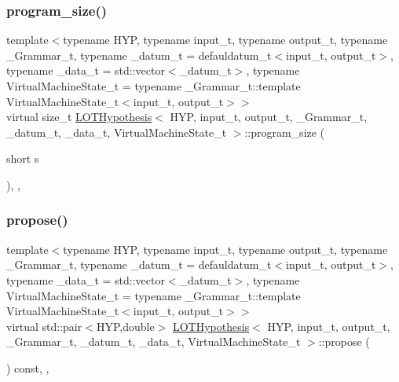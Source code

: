 \mbox{\label{class_l_o_t_hypothesis_a9fb7caa245a82c53bcfbac846ab1b327}} 
\subsubsection{\texorpdfstring{program\+\_\+size()}{program\_size()}}
{\footnotesize\ttfamily template$<$typename H\+YP, typename input\+\_\+t, typename output\+\_\+t, typename \+\_\+\+Grammar\+\_\+t, typename \+\_\+datum\+\_\+t = defauldatum\+\_\+t$<$input\+\_\+t, output\+\_\+t$>$, typename \+\_\+data\+\_\+t = std\+::vector$<$\+\_\+datum\+\_\+t$>$, typename Virtual\+Machine\+State\+\_\+t = typename \+\_\+\+Grammar\+\_\+t\+::template Virtual\+Machine\+State\+\_\+t$<$input\+\_\+t, output\+\_\+t$>$$>$ \\
virtual size\+\_\+t \hyperlink{class_l_o_t_hypothesis}{L\+O\+T\+Hypothesis}$<$ H\+YP, input\+\_\+t, output\+\_\+t, \+\_\+\+Grammar\+\_\+t, \+\_\+datum\+\_\+t, \+\_\+data\+\_\+t, Virtual\+Machine\+State\+\_\+t $>$\+::program\+\_\+size (\begin{DoxyParamCaption}\item[{short}]{s }\end{DoxyParamCaption})\hspace{0.3cm}{\ttfamily [inline]}, {\ttfamily [override]}, {\ttfamily [virtual]}}

\mbox{\label{class_l_o_t_hypothesis_a9a03abc8a6d96995c0f13524f8500747}} 
\subsubsection{\texorpdfstring{propose()}{propose()}}
{\footnotesize\ttfamily template$<$typename H\+YP, typename input\+\_\+t, typename output\+\_\+t, typename \+\_\+\+Grammar\+\_\+t, typename \+\_\+datum\+\_\+t = defauldatum\+\_\+t$<$input\+\_\+t, output\+\_\+t$>$, typename \+\_\+data\+\_\+t = std\+::vector$<$\+\_\+datum\+\_\+t$>$, typename Virtual\+Machine\+State\+\_\+t = typename \+\_\+\+Grammar\+\_\+t\+::template Virtual\+Machine\+State\+\_\+t$<$input\+\_\+t, output\+\_\+t$>$$>$ \\
virtual std\+::pair$<$H\+YP,double$>$ \hyperlink{class_l_o_t_hypothesis}{L\+O\+T\+Hypothesis}$<$ H\+YP, input\+\_\+t, output\+\_\+t, \+\_\+\+Grammar\+\_\+t, \+\_\+datum\+\_\+t, \+\_\+data\+\_\+t, Virtual\+Machine\+State\+\_\+t $>$\+::propose (\begin{DoxyParamCaption}{ }\end{DoxyParamCaption}) const\hspace{0.3cm}{\ttfamily [inline]}, {\ttfamily [override]}, {\ttfamily [virtual]}}

